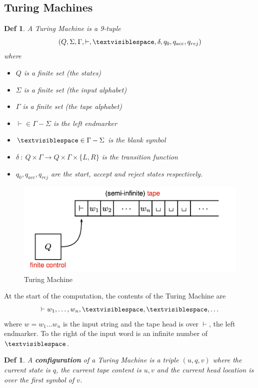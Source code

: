 \documentclass{article}
\newtheorem{defn}[dummy]{Def}
\newcommand{\blank}[0]{\textvisiblespace}
\begin{document}
    \subsection{Turing Machines}
    \begin{defn}
        A Turing Machine is a 9-tuple
        \[ (Q, \Sigma, \Gamma, \vdash, \blank, \delta, q_0, q_{acc}, q_{rej}) \]
        where
        \begin{itemize}
            \item $Q$ is a finite set (the states)
            \item $\Sigma$ is a finite set (the input alphabet)
            \item $\Gamma$ is a finite set (the tape alphabet)
            \item $\vdash \in \Gamma - \Sigma$ is the left endmarker
            \item $\blank \in \Gamma - \Sigma$ is the blank symbol
            \item $\delta \ : \ Q \times \Gamma \to Q \times \Gamma \times \{L, R \}$ is the transition function
            \item $q_0, q_{acc}, q_{rej}$ are the start, accept and reject states respectively. 
        \end{itemize}

        
    \end{defn}
    \begin{figure}[H]
        \centering
        \includegraphics[scale=0.5]{images/turingmachine.png}
        \caption{Turing Machine}
        \label{fig:turingmachine}
    \end{figure}
    At the start of the computation, the contents of the Turing Machine are 
    \[ \vdash w_1, \ldots, w_n, \blank, \blank, \ldots \]
    where $w = w_1 \ldots w_n$ is the input string and the tape head is over $\vdash$, the left endmarker. To the right of the input word is an infinite number of $\blank$. 
    \begin{defn}
        A \textbf{configuration} of a Turing Machine is a triple $(u, q, v)$ where the current state is $q$, the current tape content is $u, v$ and the current head location is over the first symbol of $v$. 
    \end{defn}
\end{document}
